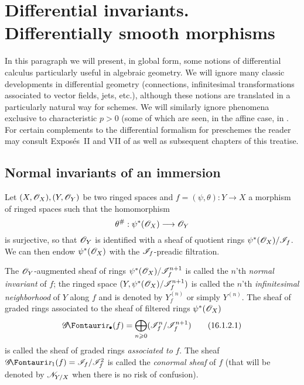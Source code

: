 \section{Differential invariants. Differentially smooth morphisms}
\label{section:IV.16}

In this paragraph we will present, in global form, some notions of differential calculus particularly useful in algebraic geometry.
We will ignore many classic developments in differential geometry (connections, infinitesimal transformations associated to vector fields, jets, etc.), although these notions are translated in a particularly natural way for schemes.
We will similarly ignore phenomena exclusive to characteristic $p>0$ (some of which are seen, in the affine case, in .
For certain complements to the differential formalism for preschemes the reader may consult Expos\'es~II and VII of \cite{IV-42} as well as subsequent chapters of this treatise. 

\subsection{Normal invariants of an immersion}
\label{IV.16.1}

\begin{env}[16.1.1]
\label{IV.16.1.1}
Let $(X, \mathscr{O}_X), (Y, \mathscr{O}_Y)$ be two ringed spaces and $f = (\psi, \theta): Y \to X$ a morphism of ringed spaces  such that the homomorphism
\[
  \theta^\#: \psi^*(\sh{O}_X) \to \sh{O}_Y
\]
is surjective, so that $\mathscr{O}_Y$ is identified with a sheaf of quotient rings $\psi^*(\mathscr{O}_X)/\mathscr{I}_f$. 
We can then endow $\psi^*(\mathscr{O}_X)$ with the $\mathscr{I}_f$-preadic filtration.
\end{env}

\begin{definition}[16.1.2]
\label{IV.16.1.2}
The $\mathscr{O}_Y$-augmented sheaf of rings $\psi^*(\mathscr{O}_X)/\mathscr{I}_f^{n+1}$ is called the $n$'th \emph{normal invariant} of $f$;
the ringed space $(Y, \psi^*(\mathscr{O}_X)/\mathscr{I}_f^{n+1})$ is called the $n$'th \emph{infinitesimal neighborhood} of $Y$ along $f$ and is denoted by $Y^{(n)}_f$ or simply $Y^{(n)}$.
The sheaf of graded rings associated to the sheaf of filtered rings $\psi^*(\mathscr{O}_X)$
\[
  \label{IV.16.1.2.1}
  \shGr_\bullet(f) = \bigoplus_{n \geq 0}(\sh{I}_f^{n}/\sh{I}_f^{n+1} )
  \tag{16.1.2.1}
\]
is called the sheaf of graded rings \emph{associated to} $f$. The sheaf $\shGr_1(f) = \sh{I}_f/\sh{I}_f^{2}$ is called the \emph{conormal sheaf} of $f$ (that will be denoted by $\mathscr{N}_{Y/X}$ when there is no risk of confusion). 
\end{definition}

